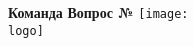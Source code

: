 





% 
    
    \noindent
    \textbf{Команда \theteams} \hfill {}  \hfill \textbf{Вопрос №\thequestions}
    \vfill
    \hspace{1mm}\texttt{[image: \\logo]}
    \newline \newline \newline
    
% 
